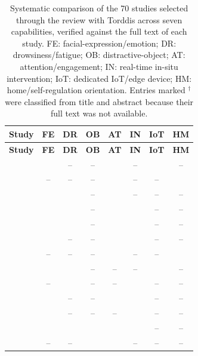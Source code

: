\begin{longtable}{@{}>{\raggedright\arraybackslash}p{5.2cm}ccccccc@{}}
	\caption{Systematic comparison of the 70 studies selected through the review with Torddis across seven capabilities, verified against the full text of each study. FE: facial-expression/emotion; DR: drowsiness/fatigue; OB: distractive-object; AT: attention/engagement; IN: real-time in-situ intervention; IoT: dedicated IoT/edge device; HM: home/self-regulation orientation. Entries marked $^{\dagger}$ were classified from title and abstract because their full text was not available.\label{tab:comparison-full}}\\
	\toprule
	\textbf{Study} & \textbf{FE} & \textbf{DR} & \textbf{OB} & \textbf{AT} & \textbf{IN} & \textbf{IoT} & \textbf{HM} \\ \midrule
	\endfirsthead
	\toprule \textbf{Study} & \textbf{FE} & \textbf{DR} & \textbf{OB} & \textbf{AT} & \textbf{IN} & \textbf{IoT} & \textbf{HM} \\ \midrule \endhead
	\citet{Alalwani2016Combined} & \checkmark & -- & -- & \checkmark & -- & \checkmark & -- \\
	\citet{Robal2018WebcamBased} & -- & -- & -- & \checkmark & -- & -- & \checkmark \\
	\citet{Wang2018Attention} & \checkmark & \checkmark & -- & \checkmark & -- & -- & -- \\
	\citet{Rk2020RealTime} & \checkmark & \checkmark & -- & \checkmark & \checkmark & -- & -- \\
	\citet{Ashwin2020Impact} & \checkmark & \checkmark & -- & \checkmark & \checkmark & -- & -- \\
	\citet{Yu2021Measuring} & \checkmark & -- & -- & \checkmark & \checkmark & -- & -- \\
	\citet{Lee2022Wedar} & -- & -- & -- & \checkmark & -- & -- & \checkmark \\
	\citet{R2022Drowsiness} & \checkmark & \checkmark & -- & -- & -- & \checkmark & -- \\
	\citet{Wang2022Online} & -- & \checkmark & -- & -- & \checkmark & -- & -- \\
	\citet{Daksith2023Multi} & \checkmark & -- & -- & \checkmark & \checkmark & -- & -- \\
	\citet{Prince2024Investigating} & \checkmark & -- & -- & -- & \checkmark & -- & -- \\
	\citet{Qi2024Evaluation} & \checkmark & \checkmark & \checkmark & \checkmark & \checkmark & -- & -- \\
	\citet{Xu2024Identifying} & -- & -- & \checkmark & \checkmark & -- & -- & -- \\

\end{longtable}
